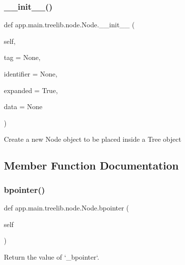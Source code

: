 \subsubsection{\texorpdfstring{\+\_\+\+\_\+init\+\_\+\+\_\+()}{\_\_init\_\_()}}
{\footnotesize\ttfamily def app.\+main.\+treelib.\+node.\+Node.\+\_\+\+\_\+init\+\_\+\+\_\+ (\begin{DoxyParamCaption}\item[{}]{self,  }\item[{}]{tag = {\ttfamily None},  }\item[{}]{identifier = {\ttfamily None},  }\item[{}]{expanded = {\ttfamily True},  }\item[{}]{data = {\ttfamily None} }\end{DoxyParamCaption})}

\begin{DoxyVerb}Create a new Node object to be placed inside a Tree object\end{DoxyVerb}
 

\subsection{Member Function Documentation}
\mbox{\label{classapp_1_1main_1_1treelib_1_1node_1_1Node_a55bc875d07efd5ef95890c57882d3578}} 
\subsubsection{\texorpdfstring{bpointer()}{bpointer()}\hspace{0.1cm}{\footnotesize\ttfamily [1/2]}}
{\footnotesize\ttfamily def app.\+main.\+treelib.\+node.\+Node.\+bpointer (\begin{DoxyParamCaption}\item[{}]{self }\end{DoxyParamCaption})}

\begin{DoxyVerb}Return the value of `_bpointer`.\end{DoxyVerb}
 \mbox{\label{classapp_1_1main_1_1treelib_1_1node_1_1Node_a74a05c3d863c43f25536f44b5e392932}} 
